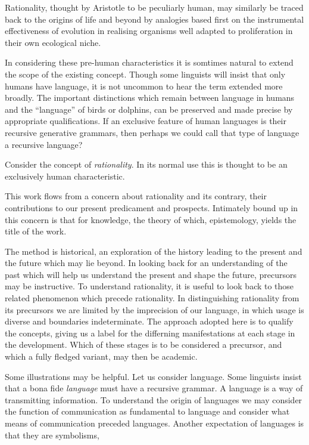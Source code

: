 \documentclass[10pt,titlepage]{book}
\begin{document}
Rationality, thought by Aristotle to be peculiarly human, may similarly be traced back to the origins of life and beyond by analogies based first on the instrumental effectiveness of evolution in realising organisms well adapted to proliferation in their own ecological niche.


In considering these pre-human characteristics it is somtimes natural to extend the scope of the existing concept.
Though some linguists will insist that only humans have language, it is not uncommon to hear the term extended more broadly.
The important distinctions which remain between language in humans and the ``language'' of birds or dolphins, can be preserved and made precise by appropriate qualifications.
If an exclusive feature of human languages is their recursive generative grammars, then perhaps we could call that type of language a recursive language?

Consider the concept of \emph{rationality}.
In its normal use this is thought to be an exclusively human characteristic.

This work flows from a concern about rationality and its contrary, their contributions to our present predicament and prospects.
Intimately bound up in this concern is that for knowledge, the theory of which, epistemology, yields the title of the work.

The method is historical, an exploration of the history leading to the present and the future which may lie beyond.
In looking back for an understanding of the past which will help us understand the present and shape the future, precursors may be instructive.
To understand rationality, it is useful to look back to those related phenomenon which precede rationality.
In distinguishing rationality from its precursors we are limited by the imprecision of our language, in which usage is diverse and boundaries indeterminate.
The approach adopted here is to qualify the concepts, giving us a label for the differning manifestations at each stage in the development.
Which of these stages is to be considered a precursor, and which a fully fledged variant, may then be academic.

Some illustrations may be helpful.
Let us consider language.
Some linguists insist that a bona fide \emph{language} must have a recursive grammar.
A language is a way of transmitting information.
To understand the origin of languages we may consider the function of communication as fundamental to language and consider what means of communication preceded languages.
Another expectation of languages is that they are symbolisms, 
\end{document}
